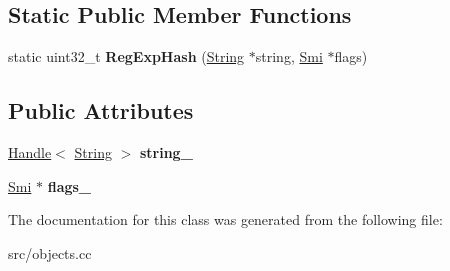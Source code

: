 \subsection*{Static Public Member Functions}
\begin{DoxyCompactItemize}
\item 
\hypertarget{classv8_1_1internal_1_1_reg_exp_key_a26dd972766f654f6cac28449ee56ae5b}{}static uint32\+\_\+t {\bfseries Reg\+Exp\+Hash} (\hyperlink{classv8_1_1internal_1_1_string}{String} $\ast$string, \hyperlink{classv8_1_1internal_1_1_smi}{Smi} $\ast$flags)\label{classv8_1_1internal_1_1_reg_exp_key_a26dd972766f654f6cac28449ee56ae5b}

\end{DoxyCompactItemize}
\subsection*{Public Attributes}
\begin{DoxyCompactItemize}
\item 
\hypertarget{classv8_1_1internal_1_1_reg_exp_key_ae4407fa7b5a7816859b04ba2bb07930a}{}\hyperlink{classv8_1_1internal_1_1_handle}{Handle}$<$ \hyperlink{classv8_1_1internal_1_1_string}{String} $>$ {\bfseries string\+\_\+}\label{classv8_1_1internal_1_1_reg_exp_key_ae4407fa7b5a7816859b04ba2bb07930a}

\item 
\hypertarget{classv8_1_1internal_1_1_reg_exp_key_a9bf85be3727458685d3f240a91b3668f}{}\hyperlink{classv8_1_1internal_1_1_smi}{Smi} $\ast$ {\bfseries flags\+\_\+}\label{classv8_1_1internal_1_1_reg_exp_key_a9bf85be3727458685d3f240a91b3668f}

\end{DoxyCompactItemize}


The documentation for this class was generated from the following file\+:\begin{DoxyCompactItemize}
\item 
src/objects.\+cc\end{DoxyCompactItemize}
